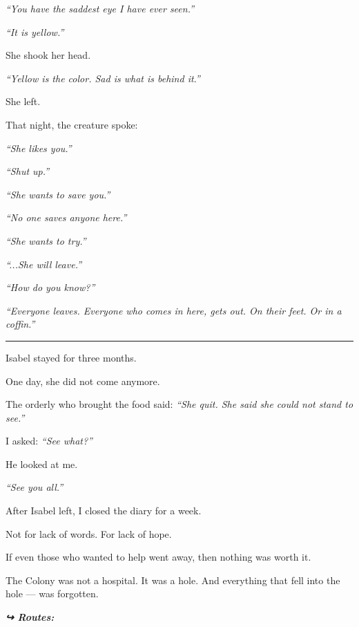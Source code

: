 \noindent \textit{\textquotedblleft{}You have the saddest eye I have ever seen.\textquotedblright{}}

\noindent \textit{\textquotedblleft{}It is yellow.\textquotedblright{}}

\noindent She shook her head.

\noindent \textit{\textquotedblleft{}Yellow is the color. Sad is what is behind it.\textquotedblright{}}

\noindent She left.

\noindent That night, the creature spoke:

\noindent \textit{\textquotedblleft{}She likes you.\textquotedblright{}}

\noindent \textit{\textquotedblleft{}Shut up.\textquotedblright{}}

\noindent \textit{\textquotedblleft{}She wants to save you.\textquotedblright{}}

\noindent \textit{\textquotedblleft{}No one saves anyone here.\textquotedblright{}}

\noindent \textit{\textquotedblleft{}She wants to try.\textquotedblright{}}

\noindent \textit{\textquotedblleft{}...She will leave.\textquotedblright{}}

\noindent \textit{\textquotedblleft{}How do you know?\textquotedblright{}}

\noindent \textit{\textquotedblleft{}Everyone leaves. Everyone who comes in here, gets out. On their feet. Or in a coffin.\textquotedblright{}}

\vspace{0.5em}\noindent\rule{\textwidth}{0.5pt}\vspace{0.5em}

\noindent Isabel stayed for three months.

\noindent One day, she did not come anymore.

\noindent The orderly who brought the food said: \textit{\textquotedblleft{}She quit. She said she could not stand to see.\textquotedblright{}}

\noindent I asked: \textit{\textquotedblleft{}See what?\textquotedblright{}}

\noindent He looked at me.

\noindent \textit{\textquotedblleft{}See you all.\textquotedblright{}}

\noindent After Isabel left, I closed the diary for a week.

\noindent Not for lack of words.
For lack of hope.

\noindent If even those who wanted to help went away, then nothing was worth it.

\noindent The Colony was not a hospital.
It was a hole.
And everything that fell into the hole --- was forgotten.

\vspace{0.5em}
\noindent\textit{\textbf{↪ Routes:}  \rotasep {}}

